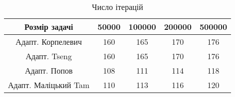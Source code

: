 \begin{table}[H]
	\centering
	\begin{tabular}{|c||c|c|c|c|}\hline
		Розмір задачі & 50000 & 100000 & 200000 & 500000 \\ \hline \hline
		Адапт. Корпелевич & 160 & 165 & 170 & 176 \\ \hline
		Адапт. Tseng & 160 & 165 & 170 & 176 \\ \hline
		Адапт. Попов & 108 & 111 & 114 & 118 \\ \hline
		Адапт. Маліцький Tam & 110 & 113 & 116 & 120 \\ \hline
	\end{tabular}
	\caption{Число ітерацій}
\end{table}
